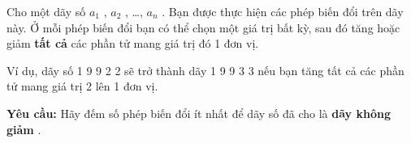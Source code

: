 Cho một dãy số $a_{1}$ , $a_{2}$ , …, $a_{n}$ . Bạn được thực hiện các phép biến đổi trên dãy này. Ở mỗi phép biến đổi bạn có thể chọn một giá trị bất kỳ, sau đó tăng hoặc giảm \textbf{ tất cả } các phần tử mang giá trị đó 1 đơn vị.

Ví dụ, dãy số 1 9 9 2 2 sẽ trở thành dãy 1 9 9 3 3 nếu bạn tăng tất cả các phần tử mang giá trị 2 lên 1 đơn vị.

\textbf{Yêu cầu: } Hãy đếm số phép biến đổi ít nhất để dãy số đã cho là \textbf{ dãy không giảm } .